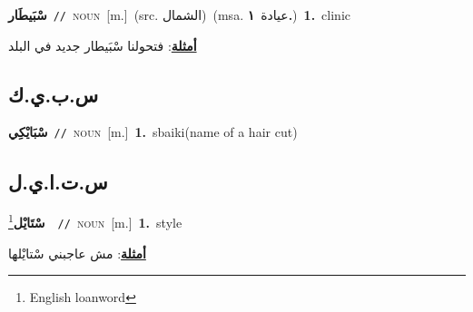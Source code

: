 \documentclass[10pt,a4paper,twoside]{article} %
\begin{document}
\begin{multicols}{2}
{{{{{{{{{{{{{\setlength\topsep{0pt}\textbf{\foreignlanguage{arabic}{سْبَيطَار}}\ {\color{gray}\texttt{//}\color{black}}\ \textsc{noun}\ [m.]\ (src. \color{gray}\foreignlanguage{arabic}{الشمال}\color{black})\ \color{gray}(msa. \foreignlanguage{arabic}{عيادة}~\foreignlanguage{arabic}{\textbf{١.}})\color{black}\ \textbf{1.}~clinic\  \begin{flushright}\color{gray}\foreignlanguage{arabic}{\textbf{\underline{\foreignlanguage{arabic}{أمثلة}}}: فتحولنا سْبَيطار جديد في البلد}\end{flushright}\color{black}} \vspace{2mm}

\vspace{-3mm}
\subsection*{\color{blue}\foreignlanguage{arabic}{س.ب.ي.ك}\color{blue}{ (ntws)}} 

{\setlength\topsep{0pt}\textbf{\foreignlanguage{arabic}{سْبَايْكِي}}\ {\color{gray}\texttt{//}\color{black}}\ \textsc{noun}\ [m.]\ \textbf{1.}~sbaiki(name of a hair cut)\ 

\vspace{-3mm}
\subsection*{\color{blue}\foreignlanguage{arabic}{س.ت.ا.ي.ل}\color{blue}{ (ntws)}} 

{\setlength\topsep{0pt}\textbf{\foreignlanguage{arabic}{سْتَايْل}}\footnote{English loanword}\ \ {\color{gray}\texttt{//}\color{black}}\ \textsc{noun}\ [m.]\ \textbf{1.}~style\  \begin{flushright}\color{gray}\foreignlanguage{arabic}{\textbf{\underline{\foreignlanguage{arabic}{أمثلة}}}: مش عاجبني سْتايْلها}\end{flushright}\color{black}} \vspace{2mm}

}}}}}}}}}}}}}
\end{multicols}
\end{document}
